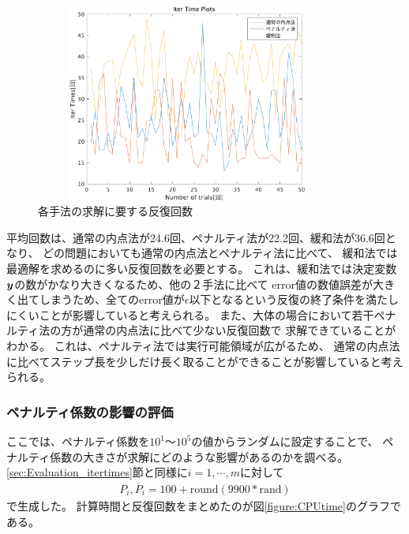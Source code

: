 \documentclass[11pt,a4paper,dvipdfmx,titlepage,uplatex]{jsarticle}
\theoremstyle{mystyle}
\newcommand{\red}[1]{\begin{color}{red}#1\end{color}}
\newcommand{\0}{\mathbf{0}}
\def\y{\mbox{\boldmath $y$}}
\begin{document}
\begin{figure}[h]
  \begin{center}
    \includegraphics[width=100mm,height=65mm]{IterTimePlots2_1.pdf}
    \caption{各手法の求解に要する反復回数 \label{figure:hanpukukaisu}}
  \end{center}
\end{figure}

平均回数は、通常の内点法が24.6回、ペナルティ法が22.2回、緩和法が36.6回となり、
どの問題においても通常の内点法とペナルティ法に比べて、
緩和法では最適解を求めるのに多い反復回数を必要とする。
これは、緩和法では決定変数$\y$の数がかなり大きくなるため、他の２手法に比べて
error値の数値誤差が大きく出てしまうため、全てのerror値が$\epsilon$以下となるという反復の終了条件を満たしにくいことが影響していると考えられる。
また、大体の場合において若干ペナルティ法の方が通常の内点法に比べて少ない反復回数で
求解できていることがわかる。
これは、ペナルティ法では実行可能領域が広がるため、
通常の内点法に比べてステップ長を少しだけ長く取ることができることが影響していると考えられる。

\subsubsection{ペナルティ係数の影響の評価}\label{sec:Evaluation_penalty_coefficient}

ここでは、ペナルティ係数を$10^1$〜$10^5$の値からランダムに設定することで、
ペナルティ係数の大きさが求解にどのような影響があるのかを調べる。
\ref{sec:Evaluation_itertimes}節と同様に$i = 1 , \cdots , m$に対して
\begin{align}
  P_i,\overline{P}_i = 100 + \text{round}(9900*\text{rand})
\end{align}
で生成した。
計算時間と反復回数をまとめたのが図\ref{figure:CPUtime}のグラフである。
\end{document}
